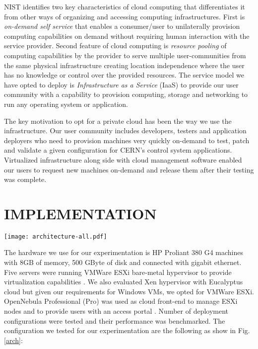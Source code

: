 \documentclass[acus]{JAC2003}
\begin{document}
NIST identifies two key characteristics of cloud computing that differentiates it from other ways of organizing and accessing computing infrastructures. First is \textit{on-demand self service} that enables a consumer/user to unilaterally provision computing capabilities on demand without requiring human interaction with the service provider. Second feature of cloud computing is \textit{resource pooling} of computing capabilities by the provider to serve multiple user-communities from the same physical infrastructure creating location independence where the user has no knowledge or control over the provided resources. The service model we have opted to deploy is \textit{Infrastructure as a Service} (IaaS) to provide our user community with a capability to provision computing, storage and networking to run any operating system or application. 

The key motivation to opt for a private cloud has been the way we use the infrastructure. Our user community includes developers, testers and application deployers who need to provision machines very quickly on-demand to test, patch and validate a given configuration for CERN's control system applications. Virtualized infrastructure along side with cloud management software enabled our users to request new machines on-demand and release them after their testing was complete.

\section{IMPLEMENTATION}

\begin{figure*}[tb]
    \centering
    \texttt{[image: architecture-all.pdf]}
    \caption{The cloud deployment architecture based on OpenNebula, OpenStack and VMWare ESXi software.}
    \label{arch}
\end{figure*}
The hardware we use for our experimentation is HP Proliant 380 G4 machines with 8GB of memory, 500 GByte of disk and connected with gigabit ethernet. Five servers were running VMWare ESXi bare-metal hypervisor to provide virtualization capabilities \cite{esxi}. We also evaluated Xen hypervisor \cite{xen} with Eucalyptus \cite{euca} cloud but given our requirements for Windows VMs, we opted for VMWare ESXi. OpenNebula Professional (Pro) was used as cloud front-end to manage ESXi nodes and to provide users with an access portal \cite{opennebula}. Number of deployment configurations were tested and their performance was benchmarked. The configuration we tested for our experimentation are the following as show in Fig. \ref{arch}:
\end{document}
